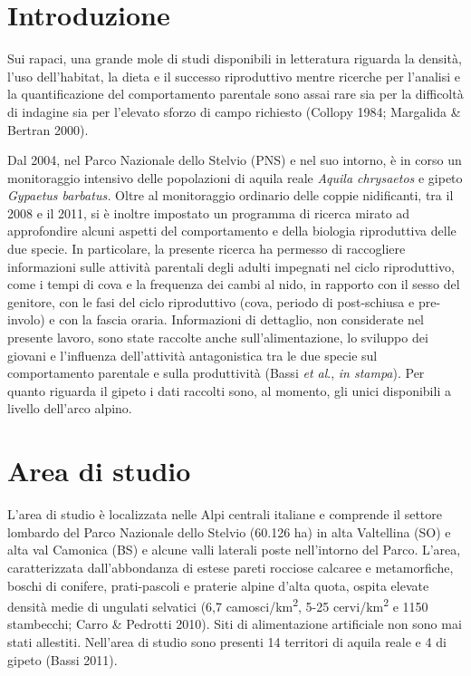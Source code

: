 \section*{Introduzione}

Sui rapaci, una grande mole di studi disponibili in letteratura riguarda
la densit\`a, l{\textquoteright}uso dell{\textquoteright}habitat, la
dieta e il successo riproduttivo mentre ricerche per
l{\textquoteright}analisi e la quantificazione del comportamento
parentale sono assai rare sia per la difficolt\`a di indagine sia per
l{\textquoteright}elevato sforzo di campo richiesto (Collopy 1984;
Margalida \& Bertran 2000).

Dal 2004, nel Parco Nazionale dello Stelvio (PNS) e nel suo intorno, \`e
in corso un monitoraggio intensivo delle popolazioni di aquila reale
\textit{Aquila chrysaetos} e gipeto \textit{Gypaetus barbatus. }Oltre
al monitoraggio ordinario delle coppie nidificanti, tra il 2008 e il
2011, si \`e inoltre impostato un programma di ricerca mirato ad
approfondire alcuni aspetti del comportamento e della biologia
riproduttiva delle due specie. In particolare, la presente ricerca ha
permesso di raccogliere informazioni sulle attivit\`a parentali degli
adulti impegnati nel ciclo riproduttivo, come i tempi di cova e la
frequenza dei cambi al nido, in rapporto con il sesso del genitore, con
le fasi del ciclo riproduttivo (cova, periodo di post-schiusa e
pre-involo) e con la fascia oraria. Informazioni di dettaglio, non
considerate nel presente lavoro, sono state raccolte anche
sull{\textquoteright}alimentazione, lo sviluppo dei giovani e
l{\textquoteright}influenza dell{\textquoteright}attivit\`a
antagonistica tra le due specie sul comportamento parentale e sulla
produttivit\`a (Bassi \textit{et al}., \textit{in stampa}). Per quanto
riguarda il gipeto i dati raccolti sono, al momento, gli unici
disponibili a livello dell{\textquoteright}arco alpino.

\section*{Area di studio}

L{\textquoteright}area di studio \`e localizzata nelle Alpi centrali
italiane e comprende il settore lombardo del Parco Nazionale dello
Stelvio (60.126 ha) in alta Valtellina (SO) e alta val Camonica (BS) e
alcune valli laterali poste nell{\textquoteright}intorno del Parco.
L{\textquoteright}area, caratterizzata dall{\textquoteright}abbondanza
di estese pareti rocciose calcaree e metamorfiche, boschi di conifere,
prati-pascoli e praterie alpine d{\textquoteright}alta quota, ospita
elevate densit\`a medie di ungulati selvatici (6,7
camosci/km\textsuperscript{2}, 5-25 cervi/km\textsuperscript{2} e 1150
stambecchi; Carro \& Pedrotti 2010). Siti di alimentazione artificiale
non sono mai stati allestiti. Nell{\textquoteright}area di studio sono
presenti 14 territori di aquila reale e 4 di gipeto (Bassi 2011).

